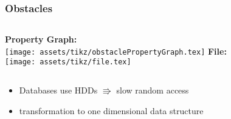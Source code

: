 \begin{frame}
    \frametitle{Obstacles}

    \begin{columns}

        \textbf{Property Graph:}\\
        \centering
        \texttt{[image: assets/tikz/obstaclePropertyGraph.tex]}
        \textbf{File:}\\
        \centering
        \texttt{[image: assets/tikz/file.tex]}
    \end{columns}

    \begin{itemize}
        \item Databases use HDDs $\Rrightarrow$ slow random access
        \item transformation to one dimensional data structure
    \end{itemize}

    
\end{frame}